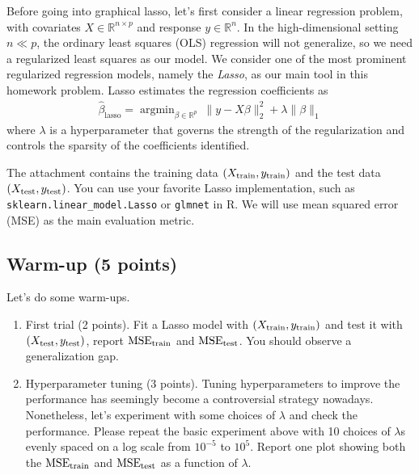 \documentclass{article}
\begin{document}
Before going into graphical lasso, let's first consider a linear regression problem, with covariates $ X \in \mathbb{R}^{n \times p} $ and response $ y \in \mathbb{R}^{n} $.
In the high-dimensional  setting $ n \ll p $, the ordinary least squares (OLS) regression will not generalize, so we need a regularized least squares as our model. 
We consider one of the most prominent regularized regression models, namely the \emph{Lasso}, as our main tool in this homework problem. 
Lasso estimates the regression coefficients as 
\begin{align}
\hat{\beta}_{\mathrm{lasso}} = \mathop{\mathrm{argmin}}_{\beta \in \mathbb{R}^{p}} \  \| y  - X \beta \|_2^2 + \lambda \|\beta \|_1
\end{align}
where $\lambda$ is a hyperparameter that governs the strength of the regularization and controls the sparsity of the coefficients identified. 

The attachment contains the training data  $ (X_{\textnormal{train}}, y_{\textnormal{train}}) $ and the test data $ (X_{\textnormal{test}}, y_{\textnormal{test}}) $. 
You can use your favorite Lasso implementation, such as \texttt{sklearn.linear\_model.Lasso} or \texttt{glmnet} in R. 
We will use mean squared error (MSE) as the main evaluation metric. 




\subsection{Warm-up (5 points)}

Let's do some warm-ups. 

\begin{enumerate}
\item 
First trial (2 points).
Fit a Lasso model with $ (X_{\textnormal{train}}, y_{\textnormal{train}}) $ and test it with $ (X_{\textnormal{test}}, y_{\textnormal{test}}) $, report $ \textnormal{MSE}_{\textnormal{train}} $ and $ \textnormal{MSE}_{\textnormal{test}} $. 
You should observe a generalization gap. 


\item 
Hyperparameter tuning (3 points). 
Tuning hyperparameters to improve the performance has seemingly become a controversial strategy nowadays. Nonetheless, let's experiment with some choices of $\lambda$ and check the performance. 
Please repeat the basic experiment above with 10 choices of $\lambda$s evenly spaced on a log scale from $10^{-5}$ to $10^{5}$. 
Report one plot showing both the $ \textnormal{MSE}_{\textnormal{train}} $ and $ \textnormal{MSE}_{\textnormal{test}} $ as a function of $\lambda$.  

\end{enumerate}
\end{document}
